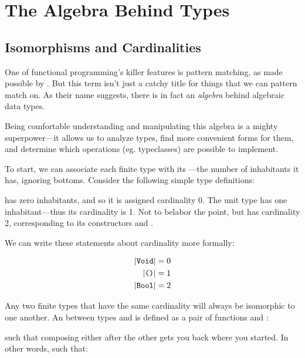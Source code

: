 \documentclass[book.tex]{subfiles}
\begin{document}
\chapter{The Algebra Behind Types}

\section{Isomorphisms and Cardinalities}

One of functional programming's killer features is pattern matching, as made
possible by . But this term
isn't just a catchy title for things that we can pattern match on. As their name
suggests, there is in fact an \emph{algebra} behind algebraic data types.

Being comfortable understanding and manipulating this algebra is a mighty
superpower---it allows us to analyze types, find more convenient forms for them,
and determine which operations (eg. typeclasses) are possible to implement.

To start, we can associate each finite type with its ---the
number of inhabitants it has, ignoring bottoms. Consider the following simple
type definitions:


 has zero inhabitants, and so it is assigned cardinality 0. The unit
type \ty{()} has one inhabitant---thus its cardinality is 1. Not to belabor
the point, but  has cardinality 2, corresponding to its constructors
 and .

We can write these statements about cardinality more formally:

$$
\begin{align*}
  \lvert\texttt{Void}\rvert &= 0 \\
  \lvert\texttt{()}\rvert &= 1 \\
  \lvert\texttt{Bool}\rvert &= 2 \\
\end{align*}
$$

Any two finite types that have the same cardinality will always be isomorphic to
one another. An  between types  and  is defined as
a pair of functions  and :


such that composing either after the other gets you back where you started. In
other words, such that:
\end{document}
